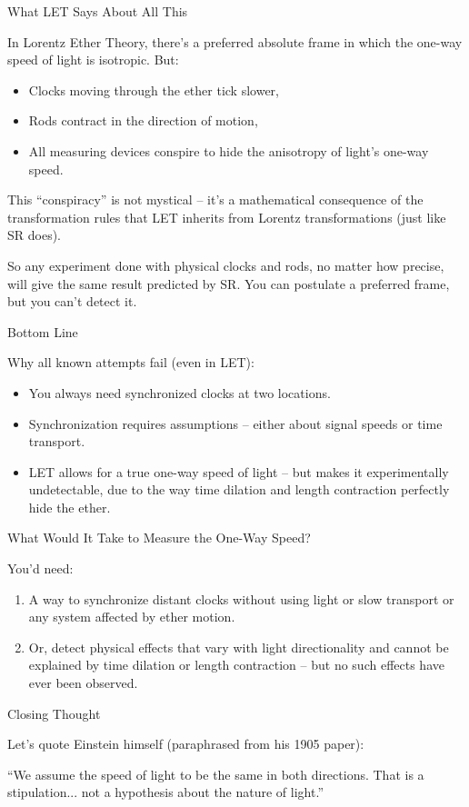 \documentclass[a4paper]{article}
\theoremstyle{plain}
\theoremstyle{definition}
\begin{document}
What LET Says About All This

In Lorentz Ether Theory, there's a preferred absolute frame in which
the one-way speed of light is isotropic.  But:
\begin{itemize}
\item Clocks moving through the ether tick slower,
\item Rods contract in the direction of motion,
\item All measuring devices conspire to hide the anisotropy of light's
  one-way speed.
\end{itemize}
This ``conspiracy'' is not mystical -- it's a mathematical consequence
of the transformation rules that LET inherits from Lorentz
transformations (just like SR does).

So any experiment done with physical clocks and rods, no matter how
precise, will give the same result predicted by SR.  You can postulate
a preferred frame, but you can't detect it.

Bottom Line

Why all known attempts fail (even in LET):
\begin{itemize}
\item You always need synchronized clocks at two locations.
\item Synchronization requires assumptions -- either about signal
  speeds or time transport.
\item LET allows for a true one-way speed of light -- but makes it
  experimentally undetectable, due to the way time dilation and length
  contraction perfectly hide the ether.
\end{itemize}

What Would It Take to Measure the One-Way Speed?

You'd need:
\begin{enumerate}
\item A way to synchronize distant clocks without using light or slow
  transport or any system affected by ether motion.
\item Or, detect physical effects that vary with light directionality
  and cannot be explained by time dilation or length contraction --
  but no such effects have ever been observed.
\end{enumerate}

Closing Thought

Let's quote Einstein himself (paraphrased from his 1905 paper):

``We assume the speed of light to be the same in both directions.
That is a stipulation... not a hypothesis about the nature of light.''
\end{document}
